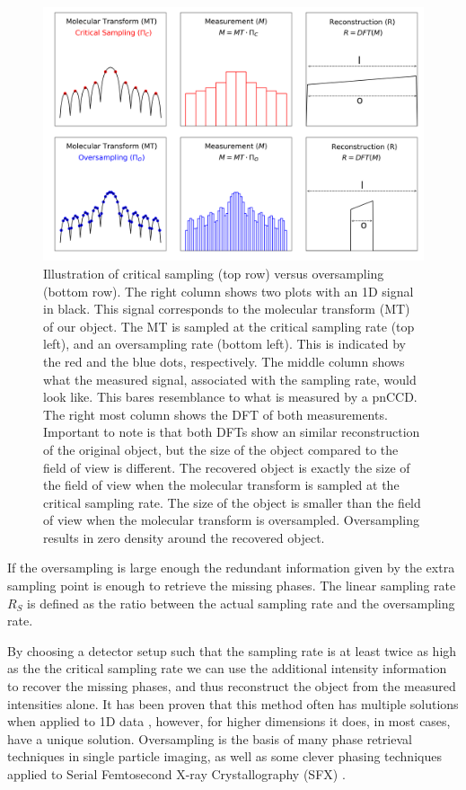 \begin{figure}[h]
	\centering 
		\includegraphics[width=120mm]{Chapter_06_Sampling.png}
	\caption{Illustration of critical sampling (top row) versus oversampling (bottom row). The right column shows two plots with an 1D signal in black. This signal corresponds to the molecular transform (MT) of our object. The MT is sampled at the critical sampling rate (top left), and an oversampling rate (bottom left). This is indicated by the red and the blue dots, respectively. The middle column shows what the measured signal, associated with the sampling rate, would look like. This bares resemblance to what is measured by a pnCCD. The right most column shows the DFT of both measurements. Important to note is that both DFTs show an similar reconstruction of the original object, but the size of the object compared to the field of view is different. The recovered object is exactly the size of the field of view when the molecular transform is sampled at the critical sampling rate. The size of the object is smaller than the field of view when the molecular transform is oversampled. Oversampling results in zero density around the recovered object.}
	\label{fig:sampling}
\end{figure}

If the oversampling is large enough the redundant information given by the extra sampling point is enough to retrieve the missing phases. The linear sampling rate $R_S$ is defined as the ratio between the actual sampling rate and the oversampling rate.

By choosing a detector setup such that the sampling rate is at least twice as high as the \cite{Bernal1938, Shannon1949a} the critical sampling rate we can use the additional intensity information to recover the missing phases, and thus reconstruct the object from the measured intensities alone. It has been proven that this method often has multiple solutions when applied to 1D data \cite{Walther1963}, however, for higher dimensions it does, in most cases, have a unique solution\cite{Bruck1979}. Oversampling is the basis of many phase retrieval techniques in single particle imaging, as well as some clever phasing techniques applied to Serial Femtosecond X-ray Crystallography (SFX) \cite{Ayyer2016,Chapman2011}.

